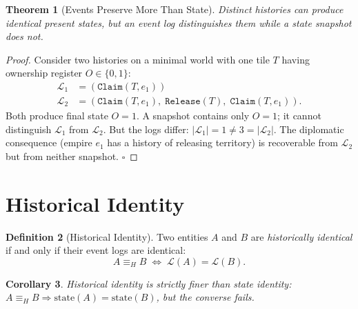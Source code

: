 \documentclass[11pt,a4paper,openany]{book}
\theoremstyle{plain}
\newtheorem{theorem}{Theorem}[chapter]
\newtheorem{corollary}[theorem]{Corollary}
\theoremstyle{definition}
\newtheorem{definition}[theorem]{Definition}
\theoremstyle{remark}
\begin{document}
\begin{theorem}[Events Preserve More Than State]
  Distinct histories can produce identical present states, but an event
  log distinguishes them while a state snapshot does not.
\end{theorem}
\begin{proof}
  Consider two histories on a minimal world with one tile $T$ having
  ownership register $O \in \{0,1\}$:
  \begin{align*}
    \mathcal{L}_1 &= (\texttt{Claim}(T, e_1)) \\
    \mathcal{L}_2 &= (\texttt{Claim}(T, e_1),\;
                      \texttt{Release}(T),\; \texttt{Claim}(T, e_1)).
  \end{align*}
  Both produce final state $O = 1$. A snapshot contains only $O = 1$;
  it cannot distinguish $\mathcal{L}_1$ from $\mathcal{L}_2$. But the
  logs differ: $|\mathcal{L}_1| = 1 \neq 3 = |\mathcal{L}_2|$. The
  diplomatic consequence (empire $e_1$ has a history of releasing
  territory) is recoverable from $\mathcal{L}_2$ but from neither
  snapshot. $\square$
\end{proof}

\section{Historical Identity}

\begin{definition}[Historical Identity]
  Two entities $A$ and $B$ are \emph{historically identical} if and only
  if their event logs are identical:
  \[
    A \equiv_H B \;\Longleftrightarrow\; \mathcal{L}(A) = \mathcal{L}(B).
  \]
\end{definition}

\begin{corollary}
  Historical identity is strictly finer than state identity:
  $A \equiv_H B \Rightarrow \mathrm{state}(A) = \mathrm{state}(B)$,
  but the converse fails.
\end{corollary}
\end{document}
